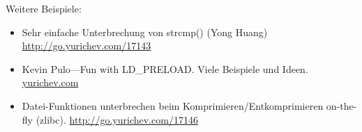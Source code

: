 Weitere Beispiele:

\begin{itemize}

\item
Sehr einfache Unterbrechung von strcmp() (Yong Huang)
\url{http://go.yurichev.com/17143}

\item
Kevin Pulo---Fun with LD\_PRELOAD. Viele Beispiele und Ideen.
\href{http://go.yurichev.com/17145}{yurichev.com}

\item
Datei-Funktionen unterbrechen beim Komprimieren/Entkomprimieren on-the-fly (zlibc). \url{http://go.yurichev.com/17146}
\end{itemize}
